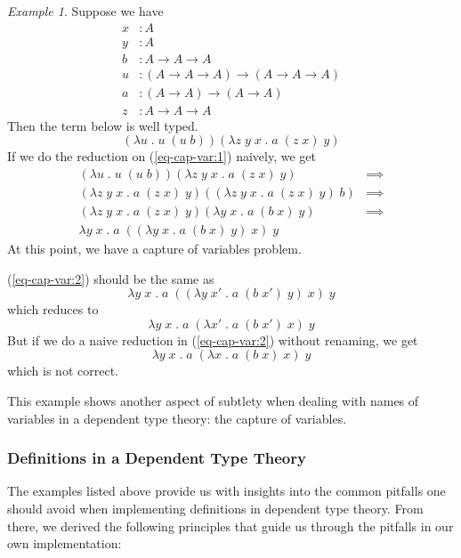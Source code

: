 \documentclass{article}
\theoremstyle{remark}
\newtheorem{example}{Example}
\begin{document}
\begin{example}\label{exa3}
  Suppose we have
  \begin{align*}
    x &: A \\
    y &: A \\
    b &: A \to A \to A \\
    u &: (A \to A \to A) \to (A \to A \to A) \\
    a &: (A \to A) \to (A \to A) \\
    z &: A \to A \to A
  \end{align*}
  Then the term below is well typed.
  \begin{equation} \label{eq-cap-var:1}
    (\lambda u \; . \; u \; (u \; b)) (\lambda z \; y \; x \; . \; a \; (z \; x) \; y)
  \end{equation}
  If we do the reduction on (\ref{eq-cap-var:1}) naively, we get
  \begin{align}
    (\lambda u \; . \; u \; (u \; b)) (\lambda z \; y \; x \; . \; a \; (z \; x) \; y) & \implies \nonumber \\
    (\lambda z \; y \; x \; . \; a \; (z \; x) \; y) ((\lambda z \; y \; x \; . \; a \; (z \; x) \; y) \; b) & \implies \nonumber \\
    (\lambda z \; y \; x \; . \; a \; (z \; x) \; y) (\lambda y \; x \; . \; a \; (b \; x) \; y) & \implies \nonumber \\
    \lambda y \; x \; . \; a \; ((\lambda y \; x \; . \; a \; (b \; x) \; y)\; x) \; y \label{eq-cap-var:2}
  \end{align}
  At this point, we have a capture of variables problem.

  (\ref{eq-cap-var:2}) should be the same as
  \[ \lambda y \; x \; . \; a \; ((\lambda y \; x' \; . \; a \; (b \; x') \; y)\; x) \; y \]
  which reduces to
  \[ \lambda y \; x \; . \; a \; (\lambda x' \; . \; a \; (b \; x') \; x) \; y \]
  But if we do a naive reduction in (\ref{eq-cap-var:2}) without renaming, we get 
  \[ \lambda y \; x \; . \; a \; (\lambda x \; . \; a \; (b \; x) \; x) \; y \]
  which is not correct.

  This example shows another aspect of subtlety when dealing with names of variables in a dependent type theory: the capture of variables.
\end{example}

\subsubsection{Definitions in a Dependent Type Theory} \label{sec:theory:definition}
The examples listed above provide us with insights into the common pitfalls one should avoid when implementing definitions in dependent type theory. From there, we derived the following principles that guide us through the pitfalls in our own implementation:
\end{document}
